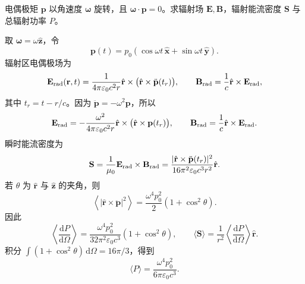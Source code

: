 \begin{question}[匀速旋转电偶极子的辐射]
电偶极矩 $\mathbf p$ 以角速度 $\boldsymbol\omega$ 旋转，且 $\boldsymbol\omega\cdot\mathbf p=0$。求辐射场 $\mathbf E,\mathbf B$，辐射能流密度 $\mathbf S$ 与总辐射功率 $P$。
\begin{solution}
取 $\boldsymbol\omega=\omega\hat{\mathbf z}$，令
\[
  \mathbf p(t)=p_0(\cos\omega t\,\hat{\mathbf x}+\sin\omega t\,\hat{\mathbf y}) .
\]
辐射区电偶极场为
\[
  \mathbf E_{\rm rad}(\mathbf r,t)
  =\frac{1}{4\pi\varepsilon_0c^2r}
  \hat{\mathbf r}\times\bigl(\hat{\mathbf r}\times\ddot{\mathbf p}(t_r)\bigr),
  \qquad
  \mathbf B_{\rm rad}=\frac{1}{c}\hat{\mathbf r}\times\mathbf E_{\rm rad},
\]
其中 $t_r=t-r/c$。因为 $\ddot{\mathbf p}=-\omega^2\mathbf p$，所以
\[
  \mathbf E_{\rm rad}
  =-\frac{\omega^2}{4\pi\varepsilon_0c^2r}
  \hat{\mathbf r}\times\bigl(\hat{\mathbf r}\times\mathbf p(t_r)\bigr),
  \qquad
  \mathbf B_{\rm rad}=\frac{1}{c}\hat{\mathbf r}\times\mathbf E_{\rm rad} .
\]
瞬时能流密度为
\[
  \mathbf S=\frac{1}{\mu_0}\mathbf E_{\rm rad}\times\mathbf B_{\rm rad}
  =\frac{|\hat{\mathbf r}\times\ddot{\mathbf p}(t_r)|^2}{16\pi^2\varepsilon_0c^3r^2}\hat{\mathbf r} .
\]
若 $\theta$ 为 $\hat{\mathbf r}$ 与 $\hat{\mathbf z}$ 的夹角，则
\[
  \left\langle |\hat{\mathbf r}\times\ddot{\mathbf p}|^2\right\rangle
  =\frac{\omega^4p_0^2}{2}(1+\cos^2\theta) .
\]
因此
\[
  \left\langle \frac{\mathrm dP}{\mathrm d\Omega}\right\rangle
  =\frac{\omega^4p_0^2}{32\pi^2\varepsilon_0c^3}(1+\cos^2\theta),
  \qquad
  \langle \mathbf S\rangle
  =\frac{1}{r^2}\left\langle\frac{\mathrm dP}{\mathrm d\Omega}\right\rangle\hat{\mathbf r} .
\]
积分 $\int(1+\cos^2\theta)\,\mathrm d\Omega=16\pi/3$，得到
\[
  \boxed{\langle P\rangle=\frac{\omega^4p_0^2}{6\pi\varepsilon_0c^3}} .
\]
\end{solution}
\end{question}

